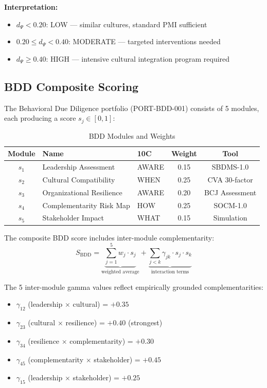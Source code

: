 \textbf{Interpretation:}
\begin{itemize}[nosep]
    \item $d_\Psi < 0.20$: LOW --- similar cultures, standard PMI sufficient
    \item $0.20 \leq d_\Psi < 0.40$: MODERATE --- targeted interventions needed
    \item $d_\Psi \geq 0.40$: HIGH --- intensive cultural integration program required
\end{itemize}


\subsection{BDD Composite Scoring}

The Behavioral Due Diligence portfolio (PORT-BDD-001) consists of 5 modules,
each producing a score $s_j \in [0,1]$:

\begin{table}[htbp]
\centering
\caption{BDD Modules and Weights}
\label{tab:ma-bdd}
\begin{tabular}{cllcc}
\toprule
\textbf{Module} & \textbf{Name} & \textbf{10C} & \textbf{Weight} & \textbf{Tool} \\
\midrule
$s_1$ & Leadership Assessment      & AWARE & 0.15 & SBDMS-1.0 \\
$s_2$ & Cultural Compatibility     & WHEN  & 0.25 & CVA 30-factor \\
$s_3$ & Organizational Resilience  & AWARE & 0.20 & BCJ Assessment \\
$s_4$ & Complementarity Risk Map   & HOW   & 0.25 & SOCM-1.0 \\
$s_5$ & Stakeholder Impact         & WHAT  & 0.15 & Simulation \\
\bottomrule
\end{tabular}
\end{table}

The composite BDD score includes inter-module complementarity:
\begin{equation}
S_{\text{BDD}} = \underbrace{\sum_{j=1}^{5} w_j \cdot s_j}_{\text{weighted average}}
+ \underbrace{\sum_{j<k} \gamma_{jk} \cdot s_j \cdot s_k}_{\text{interaction terms}}
\label{eq:ma-bdd-full}
\end{equation}

The 5 inter-module gamma values reflect empirically grounded complementarities:
\begin{itemize}[nosep]
    \item $\gamma_{12}$ (leadership $\times$ cultural) = $+0.35$
    \item $\gamma_{23}$ (cultural $\times$ resilience) = $+0.40$ (strongest)
    \item $\gamma_{34}$ (resilience $\times$ complementarity) = $+0.30$
    \item $\gamma_{45}$ (complementarity $\times$ stakeholder) = $+0.45$
    \item $\gamma_{15}$ (leadership $\times$ stakeholder) = $+0.25$
\end{itemize}

